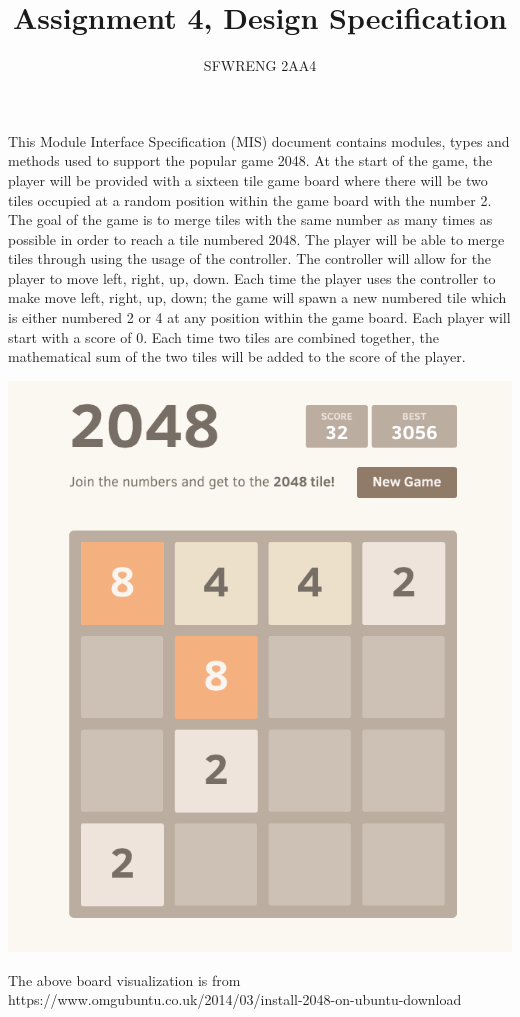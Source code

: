 \documentclass[12pt]{article}
\title{Assignment 4, Design Specification}
\author{SFWRENG 2AA4}
\begin{document}
\maketitle
This Module Interface Specification (MIS) document contains modules, types and
methods used to support the popular game 2048. At the start of the game, the player
will be provided with a sixteen tile game board where there will be two tiles 
occupied at a random position within the game board with the number 2. The goal
of the game is to merge tiles with the same number as many times as possible in
order to reach a tile numbered 2048. The player will be able to merge tiles through
using the usage of the controller. The controller will allow for the player to move
left, right, up, down. Each time the player uses the controller to make move left,
right, up, down; the game will spawn a new numbered tile which is either numbered 2
or 4 at any position within the game board. Each player will start with a score of 0.
Each time two tiles are combined together, the mathematical sum of the two tiles
will be added to the score of the player.

  \begin{center}
  \includegraphics[scale = 0.3]{sampleboard2}
  
  The above board visualization is from https://www.omgubuntu.co.uk/2014/03/install-2048-on-ubuntu-download
  \end{center}
\end{document}
